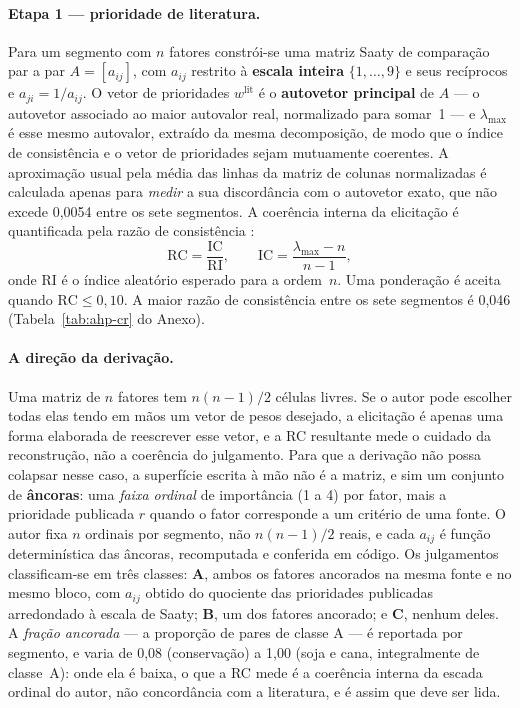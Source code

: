\paragraph{Etapa 1 --- prioridade de literatura.}
Para um segmento com $n$ fatores constrói-se uma matriz Saaty de comparação par a par
$A = [a_{ij}]$, com $a_{ij}$ restrito à \textbf{escala inteira} $\{1,\dots,9\}$ e seus recíprocos e
$a_{ji} = 1/a_{ij}$. O vetor de prioridades $w^{\mathrm{lit}}$ é o \textbf{autovetor principal} de
$A$ --- o autovetor associado ao maior autovalor real, normalizado para somar~1 --- e
$\lambda_{\max}$ é esse mesmo autovalor, extraído da mesma decomposição, de modo que o índice de
consistência e o vetor de prioridades sejam mutuamente coerentes. A aproximação usual pela média das
linhas da matriz de colunas normalizadas é calculada apenas para \emph{medir} a sua discordância com
o autovetor exato, que não excede 0,0054 entre os sete segmentos. A coerência interna da
elicitação é quantificada pela razão de consistência \citep[p.~171]{saaty_analytic_1987}:
\begin{equation*}
  \mathrm{RC} = \frac{\mathrm{IC}}{\mathrm{RI}}, \qquad
   \mathrm{IC} = \frac{\lambda_{\max} - n}{n - 1},
\end{equation*}
onde $\mathrm{RI}$ é o índice aleatório esperado para a ordem~$n$. Uma ponderação é aceita quando
$\mathrm{RC} \le 0{,}10$. A maior razão de consistência entre os sete segmentos é 0,046
(Tabela~\ref{tab:ahp-cr} do Anexo).

\paragraph{A direção da derivação.}
Uma matriz de $n$ fatores tem $n(n-1)/2$ células livres. Se o autor pode escolher todas elas tendo
em mãos um vetor de pesos desejado, a elicitação é apenas uma forma elaborada de reescrever esse
vetor, e a RC resultante mede o cuidado da reconstrução, não a coerência do julgamento. Para que a
derivação não possa colapsar nesse caso, a superfície escrita à mão não é a matriz, e sim um
conjunto de \textbf{âncoras}: uma \emph{faixa ordinal} de importância (1 a 4) por fator, mais a
prioridade publicada $r$ quando o fator corresponde a um critério de uma fonte. O autor fixa $n$
ordinais por segmento, não $n(n-1)/2$ reais, e cada $a_{ij}$ é função determinística das âncoras,
recomputada e conferida em código. Os julgamentos classificam-se em três classes: \textbf{A}, ambos
os fatores ancorados na mesma fonte e no mesmo bloco, com $a_{ij}$ obtido do quociente das
prioridades publicadas arredondado à escala de Saaty; \textbf{B}, um dos fatores ancorado; e
\textbf{C}, nenhum deles. A \emph{fração ancorada} --- a proporção de pares de classe A --- é
reportada por segmento, e varia de 0,08 (conservação) a 1,00 (soja e cana, integralmente de classe~A): onde ela é baixa, o que a RC mede é
a coerência interna da escada ordinal do autor, não concordância com a literatura, e é assim que
deve ser lida.

